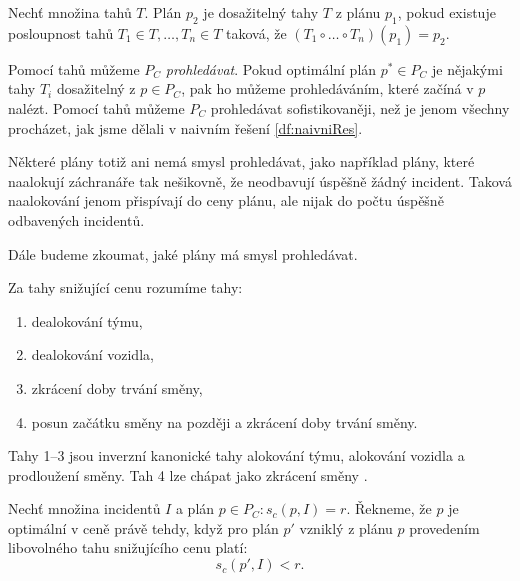\begin{definice}
  Nechť množina tahů $T$.
  Plán $p_2$ je dosažitelný tahy $T$ z plánu $p_1$, pokud existuje posloupnost tahů $T_1 \in T, \dots, T_n \in T$ taková, že $(T_1 \circ \dots \circ T_n)(p_1) = p_2$.
\end{definice}

Pomocí tahů můžeme $P_C$ \textit{prohledávat}.
Pokud optimální plán $p^* \in P_C$ je nějakými tahy $T_i$ dosažitelný z $p \in P_C$, pak ho můžeme prohledáváním, které začíná v $p$ nalézt.
Pomocí tahů můžeme $P_C$ prohledávat sofistikovaněji, než je jenom všechny procházet, jak jsme dělali v naivním řešení \ref{df:naivniRes}.

Některé plány totiž ani nemá smysl prohledávat, jako například plány, které naalokují záchranáře tak nešikovně, že neodbavují úspěšně žádný incident.
Taková naalokování jenom přispívají do ceny plánu, ale nijak do počtu úspěšně odbavených incidentů.

Dále budeme zkoumat, jaké plány má smysl prohledávat.

\begin{definice}\label{df:invKanTahy}
  Za tahy snižující cenu rozumíme tahy:
  \begin{enumerate}
    \item
      dealokování týmu,

    \item
      dealokování vozidla,

    \item
      zkrácení doby trvání směny,

    \item
      posun začátku směny na později a zkrácení doby trvání směny.

  \end{enumerate}
\end{definice}

Tahy 1--3 jsou inverzní kanonické tahy alokování týmu, alokování vozidla a prodloužení směny.
Tah 4 lze chápat jako zkrácení směny .

\begin{definice}
  Nechť množina incidentů $I$ a plán $p \in P_C \colon s_c(p, I) = r$.
  Řekneme, že $p$ je optimální v ceně právě tehdy, když
  pro plán $p'$ vzniklý z plánu $p$ provedením libovolného tahu snižujícího cenu platí: 
  \begin{equation*}
    s_c(p', I) < r.
  \end{equation*}
\end{definice}

